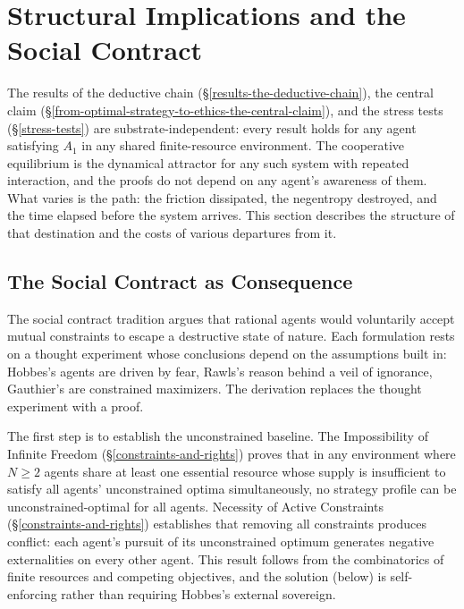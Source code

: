 \documentclass[11pt]{article}
\theoremstyle{plain}
\theoremstyle{definition}
\theoremstyle{remark}
\let\origsection\section
\renewcommand{\section}{\needspace{12\baselineskip}\origsection}
\let\origsubsection\subsection
\renewcommand{\subsection}{\needspace{7\baselineskip}\origsubsection}
\begin{document}
\section{Structural Implications and the Social
Contract}\label{structural-implications-and-the-social-contract}

The results of the deductive chain (§\ref{results-the-deductive-chain}),
the central claim
(§\ref{from-optimal-strategy-to-ethics-the-central-claim}), and the
stress tests (§\ref{stress-tests}) are substrate-independent: every
result holds for any agent satisfying \(A_1\) in any shared
finite-resource environment. The cooperative equilibrium is the
dynamical attractor for any such system with repeated interaction, and
the proofs do not depend on any agent's awareness of them. What varies
is the path: the friction dissipated, the negentropy destroyed, and the
time elapsed before the system arrives. This section describes the
structure of that destination and the costs of various departures from
it.

\subsection{The Social Contract as
Consequence}\label{the-social-contract-as-consequence}

The social contract tradition
\citep{Hobbes1651, Rawls1971, Gauthier1986} argues that rational agents
would voluntarily accept mutual constraints to escape a destructive
state of nature. Each formulation rests on a thought experiment whose
conclusions depend on the assumptions built in: Hobbes's agents are
driven by fear, Rawls's reason behind a veil of ignorance, Gauthier's
are constrained maximizers. The derivation replaces the thought
experiment with a proof.

The first step is to establish the unconstrained baseline. The
Impossibility of Infinite Freedom (§\ref{constraints-and-rights}) proves
that in any environment where \(N \geq 2\) agents share at least one
essential resource whose supply is insufficient to satisfy all agents'
unconstrained optima simultaneously, no strategy profile can be
unconstrained-optimal for all agents. Necessity of Active Constraints
(§\ref{constraints-and-rights}) establishes that removing all
constraints produces conflict: each agent's pursuit of its unconstrained
optimum generates negative externalities on every other agent. This
result follows from the combinatorics of finite resources and competing
objectives, and the solution (below) is self-enforcing rather than
requiring Hobbes's external sovereign.
\end{document}

